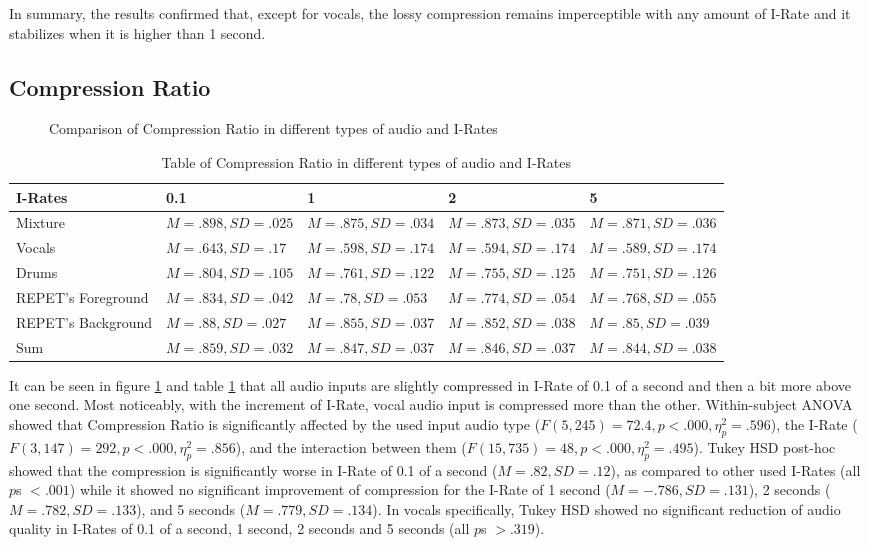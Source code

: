 In summary, the results confirmed that, except for vocals, the lossy compression remains imperceptible with any amount of I-Rate and it stabilizes when it is higher than 1 second.

\subsection{Compression Ratio}

\begin{figure}[ht]
  
  \caption{Comparison of Compression Ratio in different types of audio and I-Rates}
  \label{fig:irate-compression-ratio}
\end{figure}

\begin{table}[ht]
\centering
\begin{tabularx}{\linewidth}{|X|X|X|X|X|}
\hline
I-Rates & 0.1 & 1 & 2 & 5 \\
\hline
Mixture & $M=.898, SD=.025$ & $M=.875, SD=.034$ & $M=.873, SD=.035$ & $M=.871, SD=.036$  \\
\hline
Vocals & $M=.643, SD=.17$ & $M=.598, SD=.174$ & $M=.594, SD=.174$ & $M=.589, SD=.174$ \\
\hline
Drums & $M=.804, SD=.105$ & $M=.761, SD=.122$ & $M=.755, SD=.125$ & $M=.751, SD=.126$ \\
\hline
REPET's Foreground & $M=.834, SD=.042$ & $M=.78, SD=.053$ & $M=.774, SD=.054$ & $M=.768, SD=.055$\\
\hline
REPET's Background & $M=.88, SD=.027$ & $M=.855, SD=.037$ & $M=.852, SD=.038$ & $M=.85, SD=.039$ \\
\hline
Sum & $M=.859, SD=.032$ & $M=.847, SD=.037$ & $M=.846, SD=.037$ & $M=.844, SD=.038$ \\
\hline
\end{tabularx}
\caption{Table of Compression Ratio in different types of audio and I-Rates}
\label{tab:irate-compression-ratio}
\end{table}

It can be seen in figure \ref{fig:irate-compression-ratio} and table \ref{tab:irate-compression-ratio} that all audio inputs are slightly compressed in I-Rate of 0.1 of a second and then a bit more above one second.
Most noticeably, with the increment of I-Rate, vocal audio input is compressed more than the other.
Within-subject ANOVA showed that Compression Ratio is significantly affected by the used input audio type ($F(5,245)=72.4, p<.000, \eta_{p}^{2}=.596$), the I-Rate ($F(3,147)=292, p<.000, \eta_{p}^{2}=.856$), and the interaction between them ($F(15,735)=48, p<.000, \eta_{p}^{2}=.495$).
Tukey HSD post-hoc showed that the compression is significantly worse in I-Rate of 0.1 of a second ($M=.82, SD=.12$), as compared to other used I-Rates (all $p$s $<.001$) while it showed no significant improvement of compression for the I-Rate of 1 second ($M=-.786, SD=.131$), 2 seconds ($M=.782, SD=.133$), and 5 seconds ($M=.779, SD=.134$). 
In vocals specifically, Tukey HSD showed no significant reduction of audio quality in I-Rates of 0.1 of a second, 1 second, 2 seconds and 5 seconds (all $p$s $>.319$).

